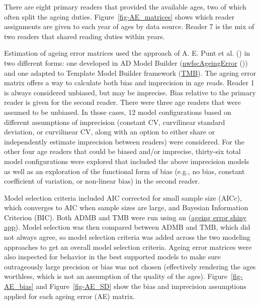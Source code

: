 \documentclass[
]{scrartcl}
\begin{document}
There are eight primary readers that provided the available ages, two of
which often split the ageing duties. Figure~\ref{fig-AE_matrices} shows
which reader assignments are given to each year of ages by data source.
Reader 7 is the mix of two readers that shared reading duties within
years.

Estimation of ageing error matrices used the approach of A. E. Punt et
al. () in two different forms:
one developed in AD Model Builder
(\href{https://github.com/pfmc-assessments/nwfscAgeingError}{nwfscAgeingError}
()) and one adapted to Template Model Builder framework
(\href{https://pfmc-assessments.github.io/AgeingError/articles/getting_started.html}{TMB}).
The ageing error matrix offers a way to calculate both bias and
imprecision in age reads. Reader 1 is always considered unbiased, but
may be imprecise. Bias relative to the primary reader is given for the
second reader. There were three age readers that were assumed to be
unbiased. In those cases, 12 model configurations based on different
assumptions of imprecision (constant CV, curvilinear standard deviation,
or curvilinear CV, along with an option to either share or independently
estimate imprecision between readers) were considered. For the other
four age readers that could be biased and/or imprecise, thirty-six total
model configurations were explored that included the above imprecision
models as well as an exploration of the functional form of bias (e.g.,
no bias, constant coefficient of variation, or non-linear bias) in the
second reader.

Model selection criteria included AIC corrected for small sample size
(AICc), which converges to AIC when sample sizes are large, and Bayesian
Information Criterion (BIC). Both ADMB and TMB were run using an
(\href{https://github.com/shcaba/Ageing_Error_app}{ageing error shiny app}).
Model selection was then compared between ADMB and TMB, which did not
always agree, so model selection criteria was added across the two
modeling approaches to get an overall model selection criteria. Ageing
error matrices were also inspected for behavior in the best supported
models to make sure outrageously large precision or bias was not chosen
(effectively rendering the ages worthless, which is not an assumption of
the quality of the ages). Figure~\ref{fig-AE_bias} and
Figure~\ref{fig-AE_SD} show the bias and imprecision assumptions applied
for each ageing error (AE) matrix.
\end{document}
